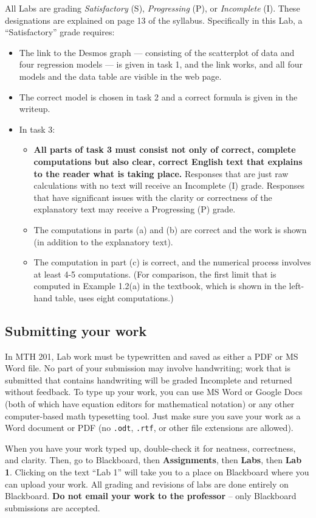 \documentclass[11pt,letterpaper]{article}
\begin{document}
All Labs are grading \emph{Satisfactory} (S), \emph{Progressing} (P), or \emph{Incomplete} (I). These designations are explained on page 13 of the syllabus. Specifically in this Lab, a ``Satisfactory'' grade requires: 
\begin{itemize}
	\item The link to the Desmos graph --- consisting of the scatterplot of data and four regression models --- is given in task 1, and the link works, and all four models and the data table are visible in the web page. 
	\item The correct model is chosen in task 2 and a correct formula is given in the writeup. 
	\item In task 3: 
		\begin{itemize}
		    \item \textbf{All parts of task 3 must consist not only of correct, complete computations but also clear, correct English text that explains to the reader what is taking place.} Responses that are just raw calculations with no text will receive an Incomplete (I) grade. Responses that have significant issues with the clarity or correctness of the explanatory text may receive a Progressing (P) grade. 
			\item The computations in parts (a) and (b) are correct and the work is shown (in addition to the explanatory text). 
			\item The computation in part (c) is correct, and the numerical process involves at least 4-5 computations. (For comparison, the first limit that is computed in Example 1.2(a) in the textbook, which is shown in the left-hand table, uses eight computations.)
		\end{itemize}
\end{itemize}

\subsection*{Submitting your work}

In MTH 201, Lab work must be typewritten and saved as either a PDF or MS Word file. No part of your submission may involve handwriting; work that is submitted that contains handwriting will be graded Incomplete and returned without feedback. To type up your work, you can use MS Word or Google Docs (both of which have equation editors for mathematical notation) or any other computer-based math typesetting tool. Just make sure you save your work as a Word document or PDF (no \texttt{.odt}, \texttt{.rtf}, or other file extensions are allowed). 

When you have your work typed up, double-check it for neatness, correctness, and clarity. Then, go to Blackboard, then \textbf{Assignments}, then \textbf{Labs}, then \textbf{Lab 1}. Clicking on the text ``Lab 1'' will take you to a place on Blackboard where you can upload your work. All grading and revisions of labs are done entirely on Blackboard. \textbf{Do not email your work to the professor} -- only Blackboard submissions are accepted. 
\end{document}
